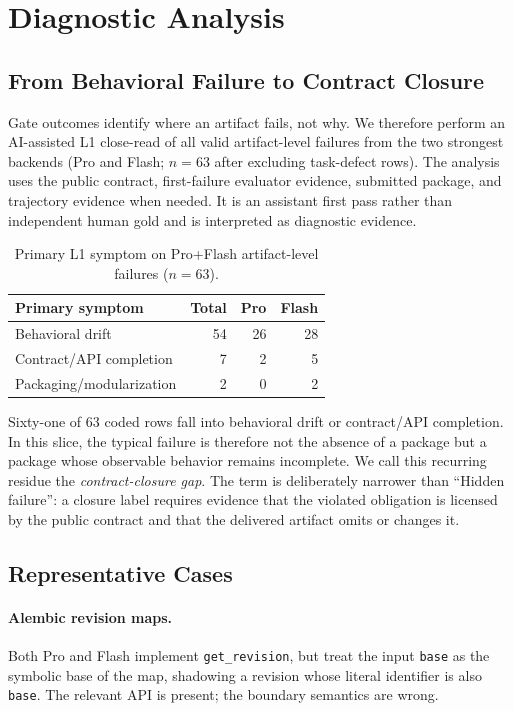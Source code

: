 \documentclass[acmsmall,screen,review,anonymous]{acmart}
\begin{document}
\section{Diagnostic Analysis}
\label{sec:analysis}

\subsection{From Behavioral Failure to Contract Closure}

Gate outcomes identify where an artifact fails, not why. We therefore perform an
AI-assisted L1 close-read of all valid artifact-level failures from the two
strongest backends (Pro and Flash; $n=63$ after excluding task-defect rows). The
analysis uses the public contract, first-failure evaluator evidence, submitted
package, and trajectory evidence when needed. It is an assistant first pass rather
than independent human gold and is interpreted as diagnostic evidence.

\begin{table}[t]
  \caption{Primary L1 symptom on Pro+Flash artifact-level failures ($n=63$).}
  \label{tab:semantic}
  \centering
  \begin{tabular}{lrrr}
    \toprule
    \textbf{Primary symptom} & \textbf{Total} & \textbf{Pro} & \textbf{Flash} \\
    \midrule
    Behavioral drift & 54 & 26 & 28 \\
    Contract/API completion & 7 & 2 & 5 \\
    Packaging/modularization & 2 & 0 & 2 \\
    \bottomrule
  \end{tabular}
\end{table}

Sixty-one of 63 coded rows fall into behavioral drift or contract/API completion.
In this slice, the typical failure is therefore not the absence of a package but a
package whose observable behavior remains incomplete. We call this recurring
residue the \emph{contract-closure gap}. The term is deliberately narrower than
``Hidden failure'': a closure label requires evidence that the violated obligation
is licensed by the public contract and that the delivered artifact omits or changes
it.

\subsection{Representative Cases}

\paragraph{Alembic revision maps.}
Both Pro and Flash implement \texttt{get\_revision}, but treat the input
\texttt{base} as the symbolic base of the map, shadowing a revision whose literal
identifier is also \texttt{base}. The relevant API is present; the boundary
semantics are wrong.
\end{document}
